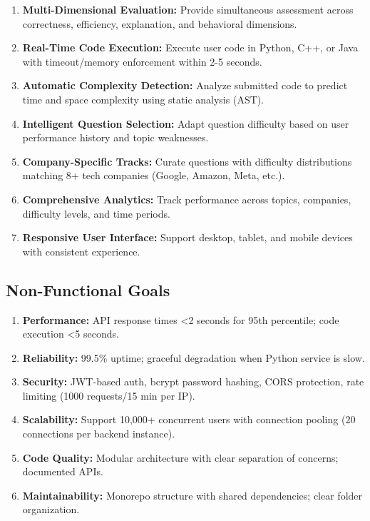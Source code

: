 \documentclass[12pt,a4paper,oneside]{article}
\begin{document}
\begin{enumerate}
    \item \textbf{Multi-Dimensional Evaluation:} Provide simultaneous assessment across correctness, efficiency, explanation, and behavioral dimensions.
    \item \textbf{Real-Time Code Execution:} Execute user code in Python, C++, or Java with timeout/memory enforcement within 2-5 seconds.
    \item \textbf{Automatic Complexity Detection:} Analyze submitted code to predict time and space complexity using static analysis (AST).
    \item \textbf{Intelligent Question Selection:} Adapt question difficulty based on user performance history and topic weaknesses.
    \item \textbf{Company-Specific Tracks:} Curate questions with difficulty distributions matching 8+ tech companies (Google, Amazon, Meta, etc.).
    \item \textbf{Comprehensive Analytics:} Track performance across topics, companies, difficulty levels, and time periods.
    \item \textbf{Responsive User Interface:} Support desktop, tablet, and mobile devices with consistent experience.
\end{enumerate}

\subsection{Non-Functional Goals}

\begin{enumerate}
    \item \textbf{Performance:} API response times \textless 2 seconds for 95th percentile; code execution \textless 5 seconds.
    \item \textbf{Reliability:} 99.5\% uptime; graceful degradation when Python service is slow.
    \item \textbf{Security:} JWT-based auth, bcrypt password hashing, CORS protection, rate limiting (1000 requests/15 min per IP).
    \item \textbf{Scalability:} Support 10,000+ concurrent users with connection pooling (20 connections per backend instance).
    \item \textbf{Code Quality:} Modular architecture with clear separation of concerns; documented APIs.
    \item \textbf{Maintainability:} Monorepo structure with shared dependencies; clear folder organization.
\end{enumerate}
\end{document}
